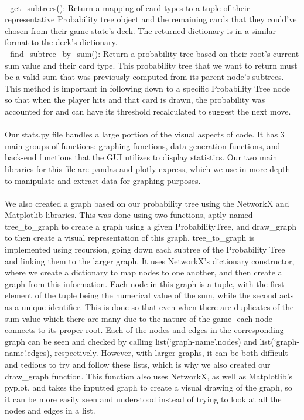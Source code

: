 \documentclass[fontsize=11pt]{article}
\begin{document}
\\
- get\_subtrees(): Return a mapping of card types to a tuple of their representative Probability tree object and the remaining cards that they could’ve chosen from their game state’s deck. The returned dictionary is in a similar format to the deck’s dictionary.
\\
- find\_subtree\_by\_sum(): Return a probability tree based on their root’s current sum value and their card type. This probability tree that we want to return must be a valid sum that was previously computed from its parent node’s subtrees. This method is important in following down to a specific Probability Tree node so that when the player hits and that card is drawn, the probability was accounted for and can have its threshold recalculated to suggest the next move.
\\\\
Our stats.py file handles a large portion of the visual aspects of code. It has 3 main groups of functions: graphing functions, data generation functions, and back-end functions that the GUI utilizes to display statistics. Our two main libraries for this file are pandas and plotly express, which we use in more depth to manipulate and extract data for graphing purposes.
\\\\
We also created a graph based on our probability tree using the NetworkX and Matplotlib libraries. This was done using two functions, aptly named tree\_to\_graph to create a graph using a given ProbabilityTree, and draw\_graph to then create a visual representation of this graph.
tree\_to\_graph is implemented using recursion, going down each subtree of the Probability Tree and linking them to the larger graph. It uses NetworkX’s dictionary constructor, where we create a dictionary to map nodes to one another, and then create a graph from this information. Each node in this graph is a tuple, with the first element of the tuple being the numerical value of the sum, while the second acts as a unique identifier. This is done so that even when there are duplicates of the sum value which there are many due to the nature of the game- each node connects to its proper root. Each of the nodes and edges in the corresponding graph can be seen and checked by calling list(‘graph-name’.nodes) and list(‘graph-name’.edges), respectively. However, with larger graphs, it can be both difficult and tedious to try and follow these lists, which is why we also created our draw\_graph function. This function also uses NetworkX, as well as Matplotlib’s pyplot, and takes the inputted graph to create a visual drawing of the graph, so it can be more easily seen and understood instead of trying to look at all the nodes and edges in a list.
\end{document}
